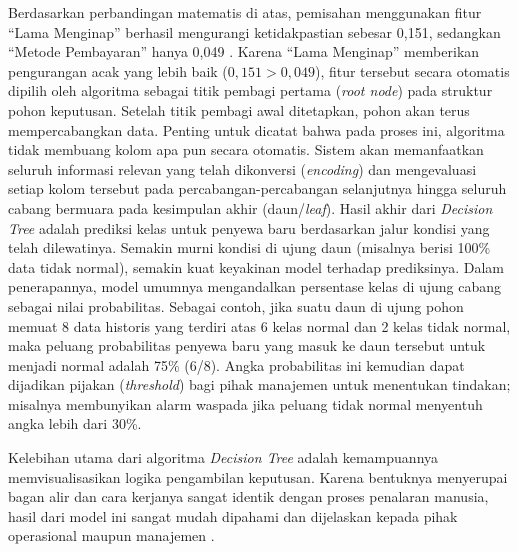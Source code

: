 Berdasarkan perbandingan matematis di atas, pemisahan menggunakan fitur ``Lama Menginap'' berhasil mengurangi ketidakpastian sebesar 0,151, sedangkan ``Metode Pembayaran'' hanya 0,049 \cite{mitchell1997machine}. Karena ``Lama Menginap'' memberikan pengurangan acak yang lebih baik ($0{,}151 > 0{,}049$), fitur tersebut secara otomatis dipilih oleh algoritma sebagai titik pembagi pertama (\textit{root node}) pada struktur pohon keputusan. Setelah titik pembagi awal ditetapkan, pohon akan terus mempercabangkan data. Penting untuk dicatat bahwa pada proses ini, algoritma tidak membuang kolom apa pun secara otomatis. Sistem akan memanfaatkan seluruh informasi relevan yang telah dikonversi (\textit{encoding}) dan mengevaluasi setiap kolom tersebut pada percabangan-percabangan selanjutnya hingga seluruh cabang bermuara pada kesimpulan akhir (daun/\textit{leaf}). Hasil akhir dari \textit{Decision Tree} adalah prediksi kelas untuk penyewa baru berdasarkan jalur kondisi yang telah dilewatinya. Semakin murni kondisi di ujung daun (misalnya berisi 100\% data tidak normal), semakin kuat keyakinan model terhadap prediksinya. Dalam penerapannya, model umumnya mengandalkan persentase kelas di ujung cabang sebagai nilai probabilitas. Sebagai contoh, jika suatu daun di ujung pohon memuat 8 data historis yang terdiri atas 6 kelas normal dan 2 kelas tidak normal, maka peluang probabilitas penyewa baru yang masuk ke daun tersebut untuk menjadi normal adalah 75\% (6/8). Angka probabilitas ini kemudian dapat dijadikan pijakan (\textit{threshold}) bagi pihak manajemen untuk menentukan tindakan; misalnya membunyikan alarm waspada jika peluang tidak normal menyentuh angka lebih dari 30\%.

Kelebihan utama dari algoritma \textit{Decision Tree} adalah kemampuannya memvisualisasikan logika pengambilan keputusan. Karena bentuknya menyerupai bagan alir dan cara kerjanya sangat identik dengan proses penalaran manusia, hasil dari model ini sangat mudah dipahami dan dijelaskan kepada pihak operasional maupun manajemen \cite{loh2011classification}.
